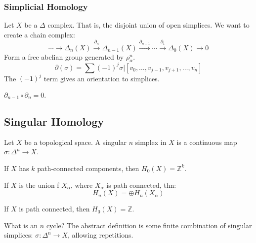         \subsubsection{Simplicial Homology}
            Let $X$ be a $\Delta$ complex. That is, the
            disjoint union of open simplices. We want to create
            a chain complex:
            \begin{equation}
                \cdots\longrightarrow\Delta_{n}(X)
                \overset{\partial_{n}}{\longrightarrow}
                \Delta_{n-1}(X)
                \overset{\partial_{n-1}}{\longrightarrow}
                \cdots
                \overset{\partial_{1}}{\longrightarrow}
                \Delta_{0}(X)
                \longrightarrow{0}
            \end{equation}
            Form a free abelian group generated by
            $\rho_{\alpha}^{n}$.
            \begin{equation}
                \partial(\sigma)=
                \sum(\minus{1})^{j}\sigma|
                [v_{0},\dots,v_{j-1},v_{j+1},\dots,v_{n}]
            \end{equation}
            The $(\minus{1})^{j}$ term gives an orientation
            to simplices.
            \begin{theorem}
                $\partial_{n-1}\circ\partial_{n}=0$.
            \end{theorem}
        \subsection{Singular Homology}
            Let $X$ be a topological space. A
            singular $n$ simplex in $X$ is a continuous map
            $\sigma:\Delta^{n}\rightarrow{X}$.
            \begin{theorem}
                If $X$ has $k$ path-connected components, then
                $H_{0}(X)=\mathbb{Z}^{k}$.
            \end{theorem}
            \begin{theorem}
                If $X$ is the union f $X_{\alpha}$, where
                $X_{\alpha}$ is path connected, thn:
                \begin{equation}
                    H_{n}(X)=\oplus{H}_{n}(X_{\alpha})
                \end{equation}
            \end{theorem}
            \begin{theorem}
                If $X$ is path connected, then
                $H_{0}(X)=\mathbb{Z}$.
            \end{theorem}
            What is an $n$ cycle? The abstract definition
            is some finite combination of singular simplices:
            $\sigma:\Delta^{n}\rightarrow{X}$, allowing
            repetitions.
